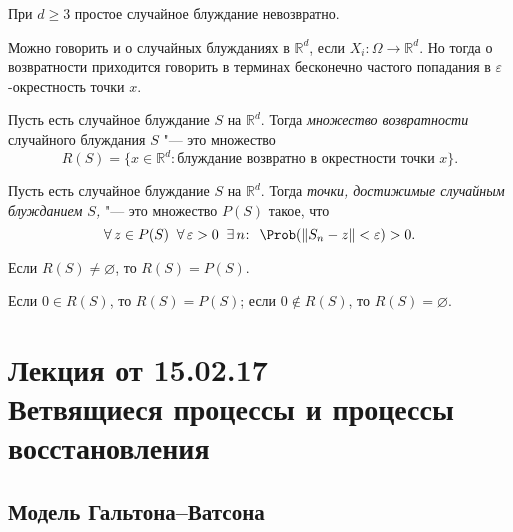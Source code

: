 \begin{cor}
  При $d \geqslant 3$ простое случайное блуждание невозвратно.
\end{cor}

\begin{note}
  \sloppy
  Можно говорить и о случайных блужданиях в $\mathbb{R}^d$, если $X_{i}: \Omega \rightarrow \mathbb{R}^d$. Но тогда о возвратности приходится говорить в терминах бесконечно частого попадания в $\varepsilon$-окрестность точки $x$.
\end{note}

\begin{df}
  Пусть есть случайное блуждание $S$ на $\mathbb{R}^d$. Тогда \emph{множество возвратности} случайного блуждания $S$ "--- это множество
  \begin{equation*}
    R(S) = \lbrace x \in \mathbb{R}^d : \text{блуждание возвратно в окрестности точки } x \rbrace \text{.}
  \end{equation*}
\end{df}

\begin{df}
  Пусть есть случайное блуждание $S$ на $\mathbb{R}^d$. Тогда \emph{точки, достижимые случайным блужданием $S$,} "--- это множество $P(S)$ такое, что
  \begin{equation*}
    \forall\, z \in P(S) \; \; \forall\, \varepsilon > 0 \; \; \exists\, n \negmedspace : \; \, \Prob( \| S_{n} - z \| < \varepsilon) > 0 \text{.}
  \end{equation*}
\end{df}

\begin{thm}
  Если $R(S) \neq \varnothing$, то $R(S) = P(S)$.
\end{thm}

\begin{cor}
  Если $0 \in R(S)$, то $R(S) = P(S)$; если
  $0 \notin R(S)$, то  $R(S) = \varnothing$.
\end{cor}

\section[Лекция от 15.02.17. Ветвящиеся процессы и процессы восстановления]{Лекция от 15.02.17\\ {\large Ветвящиеся процессы и процессы восстановления}}

\subsection{Модель Гальтона--Ватсона}

